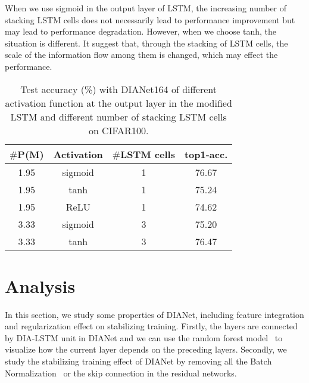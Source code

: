 \documentclass[letterpaper]{article} \usepackage{aaai20}  \usepackage{times}  \usepackage{helvet} \usepackage{courier}  \usepackage[hyphens]{url}  \usepackage{graphicx} \urlstyle{rm} \def\UrlFont{\rm}  \usepackage{graphicx}  \frenchspacing  \setlength{\pdfpagewidth}{8.5in}  \setlength{\pdfpageheight}{11in}  \usepackage{color}
\begin{document}
	When we use sigmoid in the output layer of LSTM, the increasing number of stacking LSTM cells does not necessarily lead to performance improvement but may lead to performance degradation. However, when we choose tanh, the situation is different. It suggest that, through the stacking of LSTM cells, the scale of the information flow among them is changed, which may effect the performance.
	
	\begin{table}[htbp]
		\small
		\centering
		\begin{tabular}{|c|c|c|c|}
			\toprule
			$\#$P(M) & Activation & $\#$LSTM cells& top1-acc. \\
			\midrule
			 1.95  & sigmoid & 1  & 76.67  \\
			 1.95  & tanh  & 1  & 75.24  \\
			 1.95  & ReLU & 1  & 74.62  \\
			 3.33  & sigmoid & 3  & 75.20  \\
			 3.33  & tanh  & 3  & 76.47  \\
			\bottomrule
		\end{tabular}
		\caption{Test accuracy (\%) with DIANet164 of different activation function at the output layer in the modified LSTM and different number of stacking LSTM cells on CIFAR100.}
		\label{tab:activation and number of unit}
	\end{table}	
	
	\section{Analysis}
	\label{analysis}
	
	In this section, we study some properties of DIANet, including feature integration and regularization effect on stabilizing training. Firstly, the layers are connected by DIA-LSTM unit in DIANet and we can use the random forest model~\cite{Gregorutti2017Correlation} to visualize how the current layer depends on the preceding layers. Secondly, we study the stabilizing training effect of DIANet by removing all the Batch Normalization~\cite{Ioffe:2015:BNA:3045118.3045167} or the skip connection in the residual networks.
	
\end{document}
